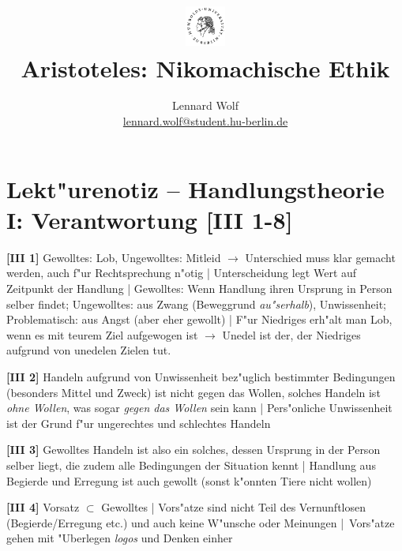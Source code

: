 \documentclass[a4paper]{article}
\date{\vspace{-3ex}}
\begin{document}
\title{
    \vspace{-30pt}
	\includegraphics*[width=0.1\textwidth,left]{ErstesSem/images/hu_logo2.png}\\
	\vspace{-10pt}
	Aristoteles: Nikomachische Ethik}
\author{Lennard Wolf\\
        \small{\href{mailto:lennard.wolf@student.hu-berlin.de}{lennard.wolf@student.hu-berlin.de}}}
\maketitle
\vspace{-4pt}

\section*{Lekt"urenotiz -- Handlungstheorie I: Verantwortung [III 1-8]}
\large

\textbf{[III 1]} Gewolltes: Lob, Ungewolltes: Mitleid $\rightarrow$ Unterschied muss klar gemacht werden, auch f"ur Rechtsprechung n"otig | Unterscheidung legt Wert auf Zeitpunkt der Handlung | Gewolltes: Wenn Handlung ihren Ursprung in Person selber findet; Ungewolltes: aus Zwang (Beweggrund \emph{au"serhalb}), Unwissenheit; Problematisch: aus Angst (aber eher gewollt) | F"ur Niedriges erh"alt man Lob, wenn es mit teurem Ziel aufgewogen ist $\rightarrow$ Unedel ist der, der Niedriges aufgrund von unedelen Zielen tut.\newline

\noindent \textbf{[III 2]} Handeln aufgrund von Unwissenheit bez"uglich bestimmter Bedingungen (besonders Mittel und Zweck) ist nicht gegen das Wollen, solches Handeln ist \emph{ohne Wollen}, was sogar \emph{gegen das Wollen} sein kann | Pers"onliche Unwissenheit ist der Grund f"ur ungerechtes und schlechtes Handeln \newline

\noindent \textbf{[III 3]} Gewolltes Handeln ist also ein solches, dessen Ursprung in der Person selber liegt, die zudem alle Bedingungen der Situation kennt | Handlung aus Begierde und Erregung ist auch gewollt (sonst k"onnten Tiere nicht wollen)\newline

\noindent \textbf{[III 4]} Vorsatz $\subset$ Gewolltes | Vors"atze sind nicht Teil des Vernunftlosen (Begierde/Erregung etc.) und auch keine W"unsche oder Meinungen | Vors"atze gehen mit "Uberlegen \emph{logos} und Denken einher\newline
\end{document}
